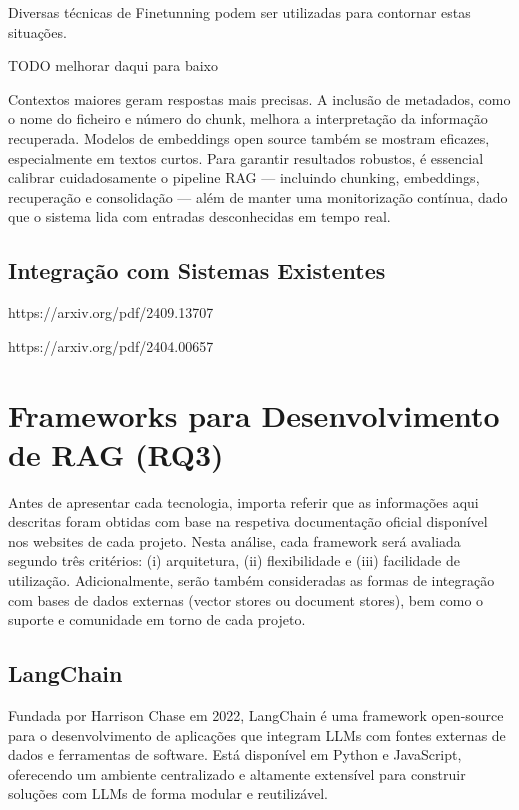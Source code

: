 Diversas técnicas de Finetunning podem ser utilizadas para contornar estas situações.

TODO melhorar daqui para baixo

Contextos maiores geram respostas mais precisas. A inclusão de metadados, como o nome do ficheiro e número do chunk, melhora a interpretação da informação recuperada. Modelos de embeddings open source também se mostram eficazes, especialmente em textos curtos. Para garantir resultados robustos, é essencial calibrar cuidadosamente o pipeline RAG — incluindo chunking, embeddings, recuperação e consolidação — além de manter uma monitorização contínua, dado que o sistema lida com entradas desconhecidas em tempo real.



\subsection{Integração com Sistemas Existentes}




https://arxiv.org/pdf/2409.13707

https://arxiv.org/pdf/2404.00657




\section{Frameworks para Desenvolvimento de RAG (RQ3)}

Antes de apresentar cada tecnologia, importa referir que as informações aqui descritas foram obtidas com base na respetiva documentação oficial disponível nos websites de cada projeto. Nesta análise, cada framework será avaliada segundo três critérios: (i) arquitetura, (ii) flexibilidade e (iii) facilidade de utilização. Adicionalmente, serão também consideradas as formas de integração com bases de dados externas (vector stores ou document stores), bem como o suporte e comunidade em torno de cada projeto.


\subsection{LangChain}


Fundada por Harrison Chase em 2022, LangChain é uma framework open-source para o desenvolvimento de aplicações que integram LLMs com fontes externas de dados e ferramentas de software. Está disponível em Python e JavaScript, oferecendo um ambiente centralizado e altamente extensível para construir soluções com LLMs de forma modular e reutilizável.


